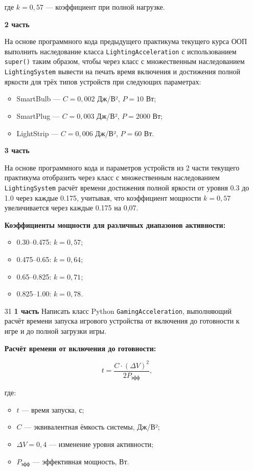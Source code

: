 \begin{enumerate}
где $k = 0{,}57$ — коэффициент при полной нагрузке.

\textbf{2 часть}

На основе программного кода предыдущего практикума текущего курса ООП выполнить наследование класса \texttt{LightingAcceleration} с использованием \texttt{super()} таким образом, чтобы через класс с множественным наследованием \texttt{LightingSystem} вывести на печать время включения и достижения полной яркости для трёх типов устройств при следующих параметрах:

\begin{itemize}
    \item SmartBulb — $C = 0{,}002$ Дж/В², $P = 10$ Вт;  
    \item SmartPlug — $C = 0{,}003$ Дж/В², $P = 2000$ Вт;  
    \item LightStrip — $C = 0{,}006$ Дж/В², $P = 60$ Вт.  
\end{itemize}

\textbf{3 часть}

На основе программного кода и параметров устройств из 2 части текущего практикума отобразить через класс с множественным наследованием \texttt{LightingSystem} расчёт времени достижения полной яркости от уровня 0.3 до 1.0 через каждые 0.175, учитывая, что коэффициент мощности $k = 0{,}57$ увеличивается через каждые 0.175 на 0{,}07.

\textbf{Коэффициенты мощности для различных диапазонов активности:}
\begin{itemize}
    \item 0.30–0.475: $k = 0{,}57$;  
    \item 0.475–0.65: $k = 0{,}64$;  
    \item 0.65–0.825: $k = 0{,}71$;  
    \item 0.825–1.00: $k = 0{,}78$.  
\end{itemize}

\item[31] \textbf{1 часть}  
Написать класс Python \texttt{GamingAcceleration}, выполняющий расчёт времени запуска игрового устройства от включения до готовности к игре и до полной загрузки игры.

\textbf{Расчёт времени от включения до готовности:}

\begin{equation}
t = \frac{C \cdot (\Delta V)^2}{2P_{\text{эфф}}},
\end{equation}

где:  
\begin{itemize}
    \item $t$ — время запуска, с;  
    \item $C$ — эквивалентная ёмкость системы, Дж/В²;  
    \item $\Delta V = 0{,}4$ — изменение уровня активности;  
    \item $P_{\text{эфф}}$ — эффективная мощность, Вт.  
\end{itemize}


\end{enumerate}

